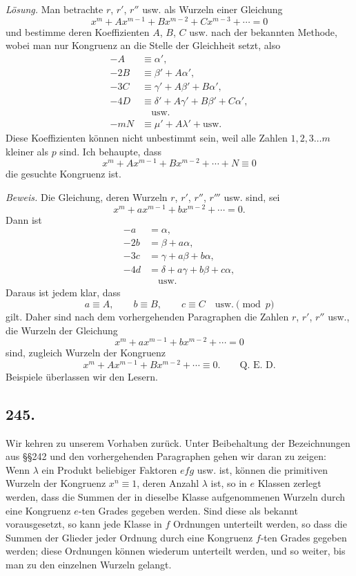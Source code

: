 \documentclass[12pt]{article}
\begin{document}
\textit{Lösung.} Man betrachte $r$, $r'$, $r''$ usw. als Wurzeln einer Gleichung
\[
x^m+A x^{m-1}+B x^{m-2}+C x^{m-3}+\cdots=0
\]
und bestimme deren Koeffizienten $A$, $B$, $C$ usw. nach der bekannten Methode, wobei man nur Kongruenz an die Stelle der Gleichheit setzt, also
\[
\begin{aligned}
-A&\equiv \alpha',\\
-2B&\equiv \beta' + A\alpha',\\
-3C&\equiv \gamma' + A\beta' + B\alpha',\\
-4D&\equiv \delta' + A\gamma' + B\beta' + C\alpha',\\
&\quad\text{usw.}\\
-mN&\equiv \mu' + A\lambda' + \text{usw.}
\end{aligned}
\]
Diese Koeffizienten können nicht unbestimmt sein, weil alle Zahlen $1,2,3\ldots m$ kleiner als $p$ sind. Ich behaupte, dass
\[
x^m+A x^{m-1}+B x^{m-2}+\cdots+N\equiv 0
\]
die gesuchte Kongruenz ist.

\textit{Beweis.} Die Gleichung, deren Wurzeln $r$, $r'$, $r''$, $r'''$ usw. sind, sei
\[
x^m+a x^{m-1}+b x^{m-2}+\cdots=0.
\]
Dann ist
\[
\begin{aligned}
-a&=\alpha,\\
-2b&=\beta+a\alpha,\\
-3c&=\gamma+a\beta+b\alpha,\\
-4d&=\delta+a\gamma+b\beta+c\alpha,\\
&\quad\text{usw.}
\end{aligned}
\]
Daraus ist jedem klar, dass
\[
a\equiv A,
\qquad b\equiv B,
\qquad c\equiv C\quad \text{usw.}\pmod p
\]
gilt. Daher sind nach dem vorhergehenden Paragraphen die Zahlen $r$, $r'$, $r''$ usw., die Wurzeln der Gleichung
\[
x^m+a x^{m-1}+b x^{m-2}+\cdots=0
\]
sind, zugleich Wurzeln der Kongruenz
\[
x^m+A x^{m-1}+B x^{m-2}+\cdots\equiv 0. \qquad \text{Q. E. D.}
\]
Beispiele überlassen wir den Lesern.

\subsection*{245.}
Wir kehren zu unserem Vorhaben zurück. Unter Beibehaltung der Bezeichnungen aus §§242 und den vorhergehenden Paragraphen gehen wir daran zu zeigen: Wenn $\lambda$ ein Produkt beliebiger Faktoren $efg$ usw. ist, können die primitiven Wurzeln der Kongruenz $x^n\equiv 1$, deren Anzahl $\lambda$ ist, so in $e$ Klassen zerlegt werden, dass die Summen der in dieselbe Klasse aufgenommenen Wurzeln durch eine Kongruenz $e$-ten Grades gegeben werden. Sind diese als bekannt vorausgesetzt, so kann jede Klasse in $f$ Ordnungen unterteilt werden, so dass die Summen der Glieder jeder Ordnung durch eine Kongruenz $f$-ten Grades gegeben werden; diese Ordnungen können wiederum unterteilt werden, und so weiter, bis man zu den einzelnen Wurzeln gelangt.
\end{document}
